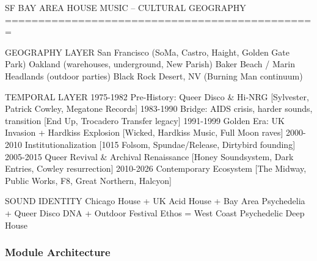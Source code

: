 \documentclass[11pt,letterpaper]{article}
\begin{document}
\begin{asciibox}
SF BAY AREA HOUSE MUSIC -- CULTURAL GEOGRAPHY
===============================================

GEOGRAPHY LAYER
  San Francisco (SoMa, Castro, Haight, Golden Gate Park)
  Oakland (warehouses, underground, New Parish)
  Baker Beach / Marin Headlands (outdoor parties)
  Black Rock Desert, NV (Burning Man continuum)

TEMPORAL LAYER
  1975-1982  Pre-History: Queer Disco & Hi-NRG
             [Sylvester, Patrick Cowley, Megatone Records]
  1983-1990  Bridge: AIDS crisis, harder sounds, transition
             [End Up, Trocadero Transfer legacy]
  1991-1999  Golden Era: UK Invasion + Hardkiss Explosion
             [Wicked, Hardkiss Music, Full Moon raves]
  2000-2010  Institutionalization
             [1015 Folsom, Spundae/Release, Dirtybird founding]
  2005-2015  Queer Revival & Archival Renaissance
             [Honey Soundsystem, Dark Entries, Cowley resurrection]
  2010-2026  Contemporary Ecosystem
             [The Midway, Public Works, F8, Great Northern, Halcyon]

SOUND IDENTITY
  Chicago House + UK Acid House
       + Bay Area Psychedelia + Queer Disco DNA
       + Outdoor Festival Ethos
       = West Coast Psychedelic Deep House
\end{asciibox}

\subsubsection{Module Architecture}
\end{document}
